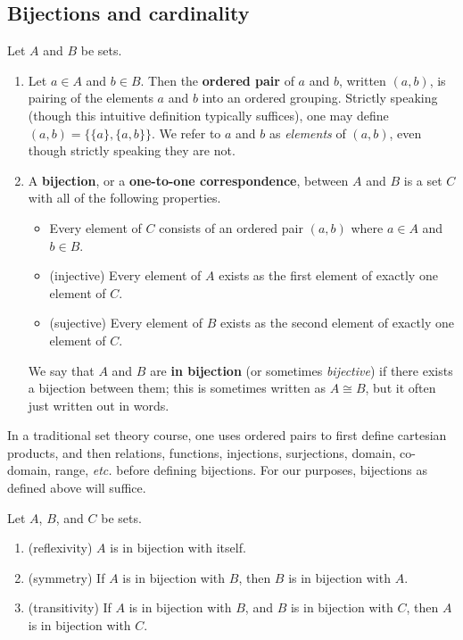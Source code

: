 \subsection{Bijections and cardinality}
\begin{definition} \label{def:bijection} Let $A$ and $B$ be sets.
\begin{enumerate}
    \item Let $a\in A$ and $b\in B$.  Then the \textbf{ordered pair} of $a$ and $b$, written $(a, b)$, is pairing of the elements $a$ and $b$ into an ordered grouping.  Strictly speaking (though this intuitive definition typically suffices), one may define $(a, b)=\{\{a\}, \{a, b\}\}$.  We refer to $a$ and $b$ as \textit{elements} of $(a,b)$, even though strictly speaking they are not.
    \item A \textbf{bijection}, or a \textbf{one-to-one correspondence}, between $A$ and $B$ is a set $C$ with all of the following properties.
    \begin{itemize}
        \item Every element of $C$ consists of an ordered pair $(a,b)$ where $a \in A$ and $b \in B$.
        \item (injective) Every element of $A$ exists as the first element of exactly one element of $C$.
        \item (sujective) Every element of $B$ exists as the second element of exactly one element of $C$.
    \end{itemize}
    We say that $A$ and $B$ are \textbf{in bijection} (or sometimes \textit{bijective}) if there exists a bijection between them; this is sometimes written as $A \cong B$, but it often just written out in words.
\end{enumerate}
\end{definition}

\begin{remark} In a traditional set theory course, one uses ordered pairs to first define cartesian products, and then relations, functions, injections, surjections, domain, co-domain, range, \textit{etc.} before defining bijections. For our purposes, bijections as defined above will suffice.
\end{remark}

\begin{theorem} Let $A$, $B$, and $C$ be sets.
\begin{enumerate}
    \item (reflexivity) $A$ is in bijection with itself.
    \item (symmetry) If $A$ is in bijection with $B$, then $B$ is in bijection with $A$.
    \item (transitivity) If $A$ is in bijection with $B$, and $B$ is in bijection with $C$, then $A$ is in bijection with $C$.
\end{enumerate}\end{theorem}

